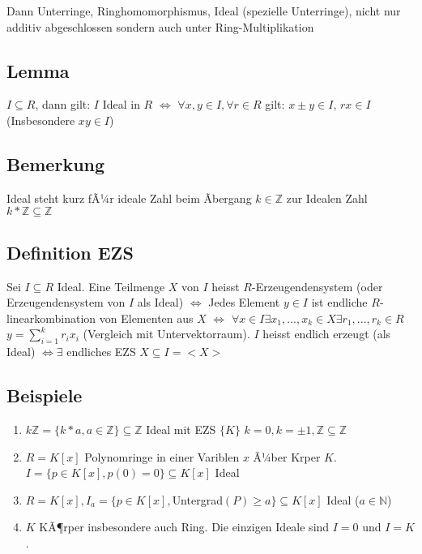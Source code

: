 \documentclass[12pt,a4paper,ngerman]{scrreprt}
\begin{document}
Dann Unterringe, Ringhomomorphismus, Ideal (spezielle Unterringe), nicht nur additiv abgeschlossen sondern auch unter Ring-Multiplikation

\subsection{Lemma}
$I \subseteq R$, dann gilt: $I$ Ideal in $R$ $\Leftrightarrow$
$\forall x,y \in I, \forall r \in R$ gilt: $x \pm y \in I$, $rx \in I$ (Insbesondere $xy \in I$)

\subsection{Bemerkung}
Ideal steht kurz fÃ¼r ideale Zahl beim Ãbergang $k \in \mathbb{Z}$ zur Idealen Zahl $k*\mathbb{Z} \subseteq \mathbb{Z}$
\subsection{Definition EZS}
Sei $I \subseteq R$ Ideal. Eine Teilmenge $X$ von $I$ heisst $R$-Erzeugendensystem (oder Erzeugendensystem von $I$ als Ideal) $\Leftrightarrow$
Jedes Element $y \in I$ ist endliche $R$-linearkombination von Elementen aus $X$ 
$\Leftrightarrow$ $\forall x \in I \exists x_1,...,x_k \in X \exists r_1,...,r_k \in R$
$y = \sum_{i=1}^k r_ix_i$ (Vergleich mit Untervektorraum). %
$I$ heisst endlich erzeugt (als Ideal) $\Leftrightarrow \exists$ endliches EZS $X \subseteq I = <X>$ %

\subsection{Beispiele}
\begin{enumerate}[(1)]
\item $k \mathbb{Z} = \{k*a, a\in \mathbb{Z} \} \subseteq \mathbb{Z}$ Ideal mit EZS $\{K\}$ %
$k = 0, k = \pm 1, \mathbb{Z} \subseteq \mathbb{Z}$
\item $R=K[x]$ Polynomringe in einer Variblen $x$ Ã¼ber Krper $K$. $I=\{p \in K[x], p(0)=0\} \subseteq K[x]$ Ideal
\item $R=K[x], I_a = \{p\in K[x], $Untergrad$(P) \geq a\} \subseteq K[x]$ Ideal ($a \in \mathbb{N}$)
\item $K$ KÃ¶rper insbesondere auch Ring. Die einzigen Ideale sind $I=0$ und $I=K$.
\end{enumerate}
\end{document}
